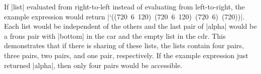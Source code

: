 If \scheme|list| evaluated from right-to-left instead of evaluating
from left-to-right, the example expression would return
\mbox{\scheme|`((720 6 120) (720 6 120) (720 6) (720))|}.  Each list
would be independent of the others and the last pair of
\scheme|alpha| would be a frons pair with \scheme|bottom| in the car
and the empty list in the cdr.  This demonstrates that if there is
sharing of these lists, the lists contain four pairs, three pairs, two
pairs, and one pair, respectively.  If the example expression just
returned \scheme|alpha|, then only four pairs would be accessible.










